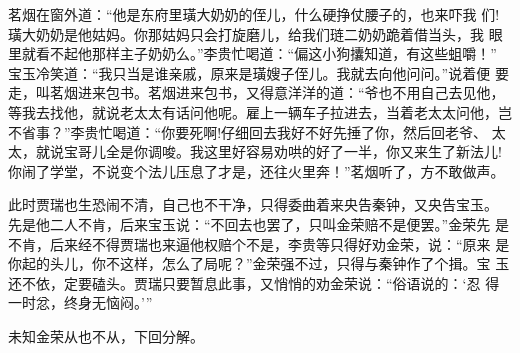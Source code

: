 茗烟在窗外道：“他是东府里璜大奶奶的侄儿，什么硬挣仗腰子的，也来吓我
们!璜大奶奶是他姑妈。你那姑妈只会打旋磨儿，给我们琏二奶奶跪着借当头，我
眼里就看不起他那样主子奶奶么。”李贵忙喝道：“偏这小狗攮知道，有这些蛆嚼！”
宝玉冷笑道：“我只当是谁亲戚，原来是璜嫂子侄儿。我就去向他问问。”说着便
要走，叫茗烟进来包书。茗烟进来包书，又得意洋洋的道：“爷也不用自己去见他，
等我去找他，就说老太太有话问他呢。雇上一辆车子拉进去，当着老太太问他，岂
不省事？”李贵忙喝道：“你要死啊!仔细回去我好不好先捶了你，然后回老爷、
太太，就说宝哥儿全是你调唆。我这里好容易劝哄的好了一半，你又来生了新法儿!
你闹了学堂，不说变个法儿压息了才是，还往火里奔！”茗烟听了，方不敢做声。

此时贾瑞也生恐闹不清，自己也不干净，只得委曲着来央告秦钟，又央告宝玉。
先是他二人不肯，后来宝玉说：“不回去也罢了，只叫金荣赔不是便罢。”金荣先
是不肯，后来经不得贾瑞也来逼他权赔个不是，李贵等只得好劝金荣，说：“原来
是你起的头儿，你不这样，怎么了局呢？”金荣强不过，只得与秦钟作了个揖。宝
玉还不依，定要磕头。贾瑞只要暂息此事，又悄悄的劝金荣说：“俗语说的：‘忍
得一时忿，终身无恼闷。’”

未知金荣从也不从，下回分解。